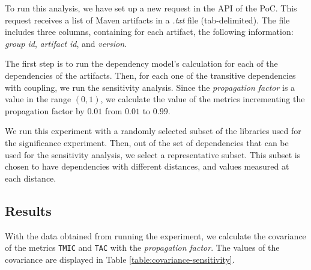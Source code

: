 To run this analysis, we have set up a new request in the API of the PoC. This request receives a list of Maven artifacts in a \textit{.txt} file (tab-delimited). The file includes three columns, containing for each artifact, the following information: \textit{group id}, \textit{artifact id}, and \textit{version}.

The first step is to run the dependency model's calculation for each of the dependencies of the artifacts. Then, for each one of the transitive dependencies with coupling, we run the sensitivity analysis. Since the \textit{propagation factor} is a value in the range $(0,1)$, we calculate the value of the metrics incrementing the propagation factor by $0.01$ from $0.01$ to $0.99$.

We run this experiment with a randomly selected subset of the libraries used for the significance experiment. Then, out of the set of dependencies that can be used for the sensitivity analysis, we select a representative subset. This subset is chosen to have dependencies with different distances, and values measured at each distance.

\subsection{Results}
With the data obtained from running the experiment, we calculate the covariance of the metrics \texttt{TMIC} and \texttt{TAC} with the \textit{propagation factor}. The values of the covariance are displayed in Table \ref{table:covariance-sensitivity}.

